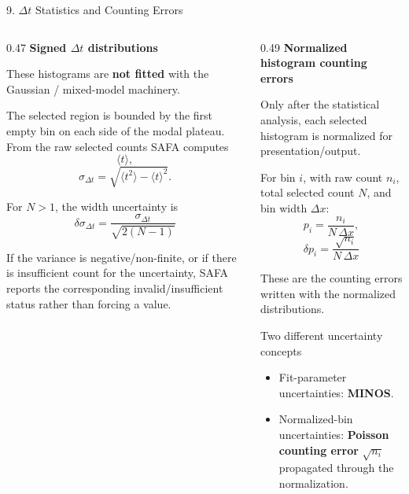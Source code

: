\documentclass{beamer}
\begin{document}
\begin{frame}{9. $\Delta t$ Statistics and Counting Errors}
\fontsize{6.7}{7.5}\selectfont

\begin{columns}[T]

\begin{column}{0.47\textwidth}
\textbf{Signed $\Delta t$ distributions}

These histograms are \textbf{not fitted} with the Gaussian / mixed-model machinery.

The selected region is bounded by the first empty bin on each side of the modal plateau. From the raw selected counts SAFA computes
\[
\langle t\rangle,
\]
\[
\sigma_{\Delta t}=\sqrt{\langle t^2\rangle-\langle t\rangle^2}.
\]

For $N>1$, the width uncertainty is
\[
\boxed{
\delta\sigma_{\Delta t}=\frac{\sigma_{\Delta t}}{\sqrt{2(N-1)}}
}
\]

If the variance is negative/non-finite, or if there is insufficient count for the uncertainty, SAFA reports the corresponding invalid/insufficient status rather than forcing a value.
\end{column}

\begin{column}{0.49\textwidth}
\textbf{Normalized histogram counting errors}

Only after the statistical analysis, each selected histogram is normalized for presentation/output.

For bin $i$, with raw count $n_i$, total selected count $N$, and bin width $\Delta x$:
\[
p_i=\frac{n_i}{N\,\Delta x},
\]
\[
\boxed{
\delta p_i=\frac{\sqrt{n_i}}{N\,\Delta x}
}
\]

These are the counting errors written with the normalized distributions.

\begin{alertblock}{Two different uncertainty concepts}
\begin{itemize}
    \setlength{\itemsep}{0.1em}
    \item Fit-parameter uncertainties: \textbf{MINOS}.
    \item Normalized-bin uncertainties: \textbf{Poisson counting error} $\sqrt{n_i}$ propagated through the normalization.
\end{itemize}
\end{alertblock}
\end{column}

\end{columns}
\end{frame}
\end{document}
